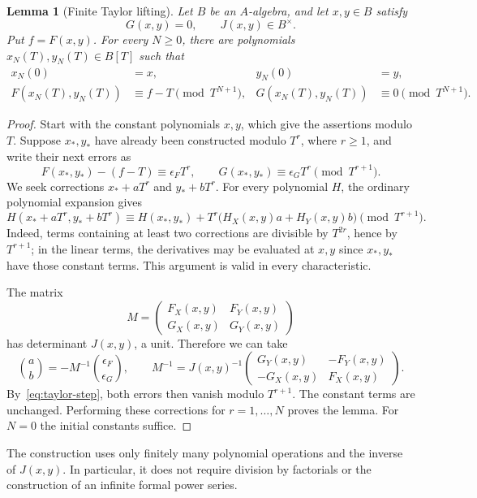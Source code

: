 \documentclass[11pt]{amsart}
\newtheorem{lemma}[theorem]{Lemma}
\theoremstyle{definition}
\theoremstyle{remark}
\begin{document}
\begin{lemma}[Finite Taylor lifting]\label{lem:taylor}
Let $B$ be an $A$-algebra, and let $x,y\in B$ satisfy
\[
 G(x,y)=0,\qquad J(x,y)\in B^\times.
\]
Put $f=F(x,y)$. For every $N\geq0$, there are polynomials
$x_N(T),y_N(T)\in B[T]$ such that
\begin{align}
 x_N(0)&=x,& y_N(0)&=y,\label{eq:initial}\\
 F(x_N(T),y_N(T))&\equiv f-T\pmod {T^{N+1}},&
 G(x_N(T),y_N(T))&\equiv0\pmod {T^{N+1}}.
 \label{eq:lift}
\end{align}
\end{lemma}
\begin{proof}
Start with the constant polynomials $x,y$, which give the assertions
modulo $T$. Suppose $x_*,y_*$ have already been constructed modulo
$T^r$, where $r\geq1$, and write their next errors as
\[
 F(x_*,y_*)-(f-T)\equiv\epsilon_FT^r,\qquad
 G(x_*,y_*)\equiv\epsilon_GT^r
 \pmod {T^{r+1}}.
\]
We seek corrections $x_*+aT^r$ and $y_*+bT^r$.
For every polynomial $H$, the ordinary polynomial expansion gives
\begin{equation}\label{eq:taylor-step}
 H(x_*+aT^r,y_*+bT^r)
 \equiv H(x_*,y_*)+
 T^r\bigl(H_X(x,y)a+H_Y(x,y)b\bigr)
 \pmod {T^{r+1}}.
\end{equation}
Indeed, terms containing at least two corrections are divisible by
$T^{2r}$, hence by $T^{r+1}$; in the linear terms, the derivatives
may be evaluated at $x,y$ since $x_*,y_*$ have those constant terms.
This argument is valid in every characteristic.

The matrix
\[
 M=\begin{pmatrix}
 F_X(x,y)&F_Y(x,y)\\
 G_X(x,y)&G_Y(x,y)
 \end{pmatrix}
\]
has determinant $J(x,y)$, a unit. Therefore we can take
\[
 \binom ab=-M^{-1}\binom{\epsilon_F}{\epsilon_G},\qquad
 M^{-1}=J(x,y)^{-1}
 \begin{pmatrix}G_Y(x,y)&-F_Y(x,y)\\-G_X(x,y)&F_X(x,y)\end{pmatrix}.
\]
By~\eqref{eq:taylor-step}, both errors then vanish modulo $T^{r+1}$.
The constant terms are unchanged. Performing these corrections for
$r=1,\ldots,N$ proves the lemma. For $N=0$ the initial constants suffice.
\end{proof}

The construction uses only finitely many polynomial operations and the
inverse of $J(x,y)$. In particular, it does not require division by
factorials or the construction of an infinite formal power series.
\end{document}
